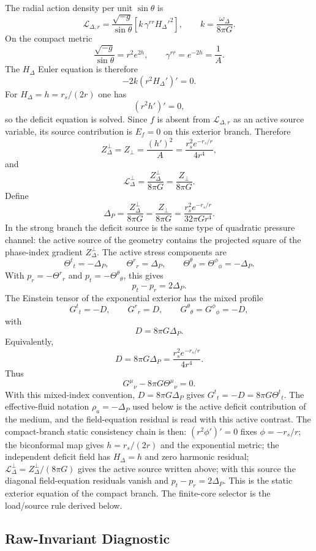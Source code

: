\documentclass[12pt,a4paper]{article}
\begin{document}
The radial action density per unit $\sin\theta$ is
\[
\mathcal L_{\Delta,r}
=\frac{\sqrt{-g}}{\sin\theta}
\left[
k\,\gamma^{rr}H_\Delta'^2
\right],
\qquad
k=\frac{\omega_\Delta}{8\pi G}.
\]
On the compact metric
\[
\frac{\sqrt{-g}}{\sin\theta}=r^2e^{2h},\qquad
\gamma^{rr}=e^{-2h}=\frac{1}{A}.
\]
The $H_\Delta$ Euler equation is therefore
\[
-2k\left(r^2H_\Delta'\right)'=0.
\]
For $H_\Delta=h=r_s/(2r)$ one has
\[
\left(r^2h'\right)'=0,
\]
so the deficit equation is solved. Since $f$ is absent from
$\mathcal L_{\Delta,r}$ as an active source variable, its source contribution is
$E_f=0$ on this exterior branch.
Therefore
\[
Z_\Delta^\perp=Z_\perp=\frac{(h')^2}{A}
=\frac{r_s^2e^{-r_s/r}}{4r^4},
\]
and
\[
\mathcal L_\Delta^\perp=\frac{Z_\Delta^\perp}{8\pi G}
=\frac{Z_\perp}{8\pi G}.
\]
Define
\[
\Delta_P=\frac{Z_\Delta^\perp}{8\pi G}
=\frac{Z_\perp}{8\pi G}
=\frac{r_s^2e^{-r_s/r}}{32\pi G r^4}.
\]
In the strong branch the deficit source is the same type of quadratic
pressure channel: the active source of the geometry contains the projected
square of the phase-index gradient $Z_\Delta^\perp$.
The active stress components are
\[
\Theta^t{}_t=-\Delta_P,\qquad
\Theta^r{}_r=\Delta_P,\qquad
\Theta^\theta{}_\theta=\Theta^\phi{}_\phi=-\Delta_P.
\]
With $p_r=-\Theta^r{}_r$ and $p_t=-\Theta^\theta{}_\theta$, this gives
\[
p_t-p_r=2\Delta_P.
\]
The Einstein tensor of the exponential exterior has the mixed profile
\[
G^t{}_t=-D,\qquad
G^r{}_r=D,\qquad
G^\theta{}_\theta=G^\phi{}_\phi=-D,
\]
with
\[
D=8\pi G\Delta_P.
\]
Equivalently,
\[
D=8\pi G\Delta_P=\frac{r_s^2e^{-r_s/r}}{4r^4}.
\]
Thus
\[
G^\mu{}_\nu-8\pi G\Theta^\mu{}_\nu=0.
\]
With this mixed-index convention, $D=8\pi G\Delta_P$ gives $G^t{}_t=-D=8\pi G\Theta^t{}_t$. The effective-fluid notation $\rho_a=-\Delta_P$ used below is the active deficit contribution of the medium, and the field-equation residual is read with this active contrast.
The compact-branch static consistency chain is then: $(r^2\phi')'=0$ fixes $\phi=-r_s/r$; the biconformal map gives $h=r_s/(2r)$ and the exponential metric; the independent deficit field has $H_\Delta=h$ and zero harmonic residual; $\mathcal L_\Delta^\perp=Z_\Delta^\perp/(8\pi G)$ gives the active source written above; with this source the diagonal field-equation residuals vanish and $p_t-p_r=2\Delta_P$. This is the static exterior equation of the compact branch. The finite-core selector is the load/source rule derived below.

\subsection{Raw-Invariant Diagnostic}
\end{document}
